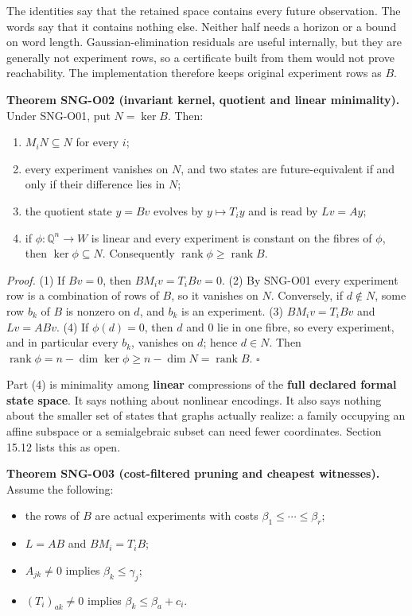 \documentclass[
  11pt,
  a4paper,
]{report}
\providecommand{\tightlist}{%
  \setlength{\itemsep}{0pt}\setlength{\parskip}{0pt}}
\begin{document}
The identities say that the retained space contains every future
observation. The words say that it contains nothing else. Neither half
needs a horizon or a bound on word length. Gaussian-elimination
residuals are useful internally, but they are generally not experiment
rows, so a certificate built from them would not prove reachability. The
implementation therefore keeps original experiment rows as \(B\).

\textbf{Theorem SNG-O02 (invariant kernel, quotient and linear
minimality).} Under SNG-O01, put \(N=\ker B\). Then:

\begin{enumerate}
\def\labelenumi{\arabic{enumi}.}
\tightlist
\item
  \(M_iN\subseteq N\) for every \(i\);
\item
  every experiment vanishes on \(N\), and two states are
  future-equivalent if and only if their difference lies in \(N\);
\item
  the quotient state \(y=Bv\) evolves by \(y\mapsto T_iy\) and is read
  by \(Lv=Ay\);
\item
  if \(\phi:\mathbb Q^n\to W\) is linear and every experiment is
  constant on the fibres of \(\phi\), then \(\ker\phi\subseteq N\).
  Consequently \(\operatorname{rank}\phi\ge\operatorname{rank}B\).
\end{enumerate}

\emph{Proof.} (1) If \(Bv=0\), then \(BM_iv=T_iBv=0\). (2) By SNG-O01
every experiment row is a combination of rows of \(B\), so it vanishes
on \(N\). Conversely, if \(d\notin N\), some row \(b_k\) of \(B\) is
nonzero on \(d\), and \(b_k\) is an experiment. (3) \(BM_iv=T_iBv\) and
\(Lv=ABv\). (4) If \(\phi(d)=0\), then \(d\) and \(0\) lie in one fibre,
so every experiment, and in particular every \(b_k\), vanishes on \(d\);
hence \(d\in N\). Then
\(\operatorname{rank}\phi=n-\dim\ker\phi\ge n-\dim N=\operatorname{rank}B\).
\(\square\)

Part (4) is minimality among \textbf{linear} compressions of the
\textbf{full declared formal state space}. It says nothing about
nonlinear encodings. It also says nothing about the smaller set of
states that graphs actually realize: a family occupying an affine
subspace or a semialgebraic subset can need fewer coordinates. Section
15.12 lists this as open.

\textbf{Theorem SNG-O03 (cost-filtered pruning and cheapest witnesses).}
Assume the following:

\begin{itemize}
\tightlist
\item
  the rows of \(B\) are actual experiments with costs
  \(\beta_1\le\cdots\le\beta_r\);
\item
  \(L=AB\) and \(BM_i=T_iB\);
\item
  \(A_{jk}\ne0\) implies \(\beta_k\le\gamma_j\);
\item
  \((T_i)_{ak}\ne0\) implies \(\beta_k\le\beta_a+c_i\).
\end{itemize}
\end{document}
